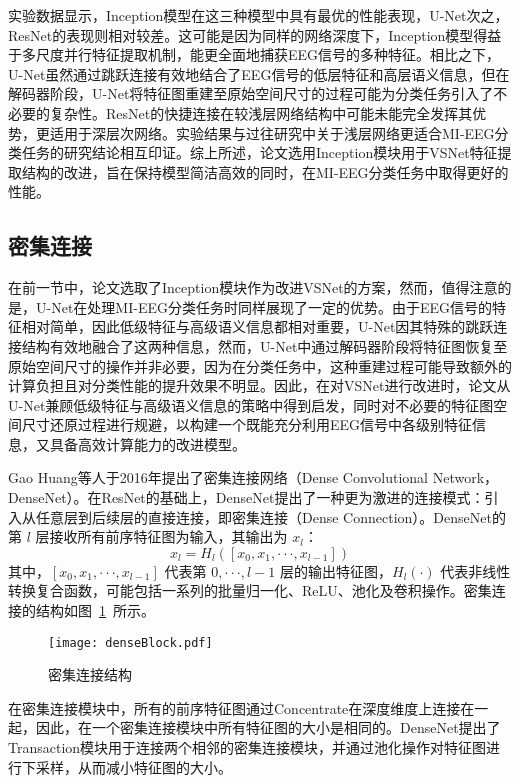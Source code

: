 实验数据显示，Inception模型在这三种模型中具有最优的性能表现，U-Net次之，ResNet的表现则相对较差。这可能是因为同样的网络深度下，Inception模型得益于多尺度并行特征提取机制，能更全面地捕获EEG信号的多种特征。相比之下，U-Net虽然通过跳跃连接有效地结合了EEG信号的低层特征和高层语义信息，但在解码器阶段，U-Net将特征图重建至原始空间尺寸的过程可能为分类任务引入了不必要的复杂性。ResNet的快捷连接在较浅层网络结构中可能未能完全发挥其优势，更适用于深层次网络。实验结果与过往研究中关于浅层网络更适合MI-EEG分类任务的研究结论相互印证。综上所述，论文选用Inception模块用于VSNet特征提取结构的改进，旨在保持模型简洁高效的同时，在MI-EEG分类任务中取得更好的性能。

\subsection{密集连接}

在前一节中，论文选取了Inception模块作为改进VSNet的方案，然而，值得注意的是，U-Net在处理MI-EEG分类任务时同样展现了一定的优势。由于EEG信号的特征相对简单，因此低级特征与高级语义信息都相对重要，U-Net因其特殊的跳跃连接结构有效地融合了这两种信息，然而，U-Net中通过解码器阶段将特征图恢复至原始空间尺寸的操作并非必要，因为在分类任务中，这种重建过程可能导致额外的计算负担且对分类性能的提升效果不明显。因此，在对VSNet进行改进时，论文从U-Net兼顾低级特征与高级语义信息的策略中得到启发，同时对不必要的特征图空间尺寸还原过程进行规避，以构建一个既能充分利用EEG信号中各级别特征信息，又具备高效计算能力的改进模型。

Gao Huang等人于2016年提出了密集连接网络\cite{huang2017densely}（Dense Convolutional Network，DenseNet）。在ResNet的基础上，DenseNet提出了一种更为激进的连接模式：引入从任意层到后续层的直接连接，即密集连接（Dense Connection）。DenseNet的第 \(l\) 层接收所有前序特征图为输入，其输出为 \(x_l\)：
\begin{equation}
  x_l = H_l([x_0, x_1, ···, x_{l-1}])
  \label{eq:dense-conn}
\end{equation}
其中，\([x_0, x_1, ···, x_{l-1}]\) 代表第 \(0, ···, l-1\) 层的输出特征图，\(H_l(·)\) 代表非线性转换复合函数，可能包括一系列的批量归一化、ReLU、池化及卷积操作。密集连接的结构如图~\ref{fig:denseBlock}~所示。
\begin{figure}
  \centering
  \texttt{[image: denseBlock.pdf]}
  \caption{密集连接结构}
  \label{fig:denseBlock}
\end{figure}

在密集连接模块中，所有的前序特征图通过Concentrate在深度维度上连接在一起，因此，在一个密集连接模块中所有特征图的大小是相同的。DenseNet提出了Transaction模块用于连接两个相邻的密集连接模块，并通过池化操作对特征图进行下采样，从而减小特征图的大小。

